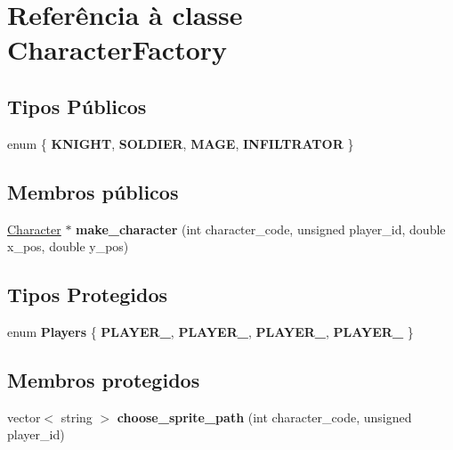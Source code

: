 \hypertarget{classCharacterFactory}{}\section{Referência à classe Character\+Factory}
\label{classCharacterFactory}
\subsection*{Tipos Públicos}
\begin{DoxyCompactItemize}
\item 
\mbox{\label{classCharacterFactory_a9c158e1e9a98eb86795a1b19367a9ded}} 
enum \{ {\bfseries K\+N\+I\+G\+HT}, 
{\bfseries S\+O\+L\+D\+I\+ER}, 
{\bfseries M\+A\+GE}, 
{\bfseries I\+N\+F\+I\+L\+T\+R\+A\+T\+OR}
 \}
\end{DoxyCompactItemize}
\subsection*{Membros públicos}
\begin{DoxyCompactItemize}
\item 
\mbox{\label{classCharacterFactory_ad28bc656d818229560fd1757a702a3ac}} 
\mbox{\hyperlink{classCharacter}{Character}} $\ast$ {\bfseries make\+\_\+character} (int character\+\_\+code, unsigned player\+\_\+id, double x\+\_\+pos, double y\+\_\+pos)
\end{DoxyCompactItemize}
\subsection*{Tipos Protegidos}
\begin{DoxyCompactItemize}
\item 
\mbox{\label{classCharacterFactory_ab974578549c551e10056540617a269df}} 
enum {\bfseries Players} \{ {\bfseries P\+L\+A\+Y\+E\+R\+\_}, 
{\bfseries P\+L\+A\+Y\+E\+R\+\_}, 
{\bfseries P\+L\+A\+Y\+E\+R\+\_}, 
{\bfseries P\+L\+A\+Y\+E\+R\+\_}
 \}
\end{DoxyCompactItemize}
\subsection*{Membros protegidos}
\begin{DoxyCompactItemize}
\item 
\mbox{\label{classCharacterFactory_ae34183113755bfceb1a2906686e999af}} 
vector$<$ string $>$ {\bfseries choose\+\_\+sprite\+\_\+path} (int character\+\_\+code, unsigned player\+\_\+id)
\end{DoxyCompactItemize}
